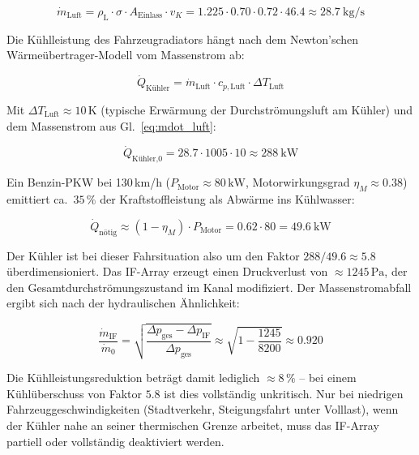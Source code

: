 ﻿\documentclass[12pt, a4paper]{report}
\theoremstyle{definition}
\theoremstyle{remark}
\newcommand{\rhoL}{\rho_{\text{L}}}
\newcommand{\Aeinlass}{A_{\text{Einlass}}}
\begin{document}
\begin{equation}
  \dot{m}_{\text{Luft}} = \rhoL \cdot \sigma \cdot \Aeinlass \cdot v_K
  = 1.225 \cdot 0.70 \cdot 0.72 \cdot 46.4 \approx \SI{28.7}{\kilo\gram\per\second}
  \label{eq:mdot_luft}
\end{equation}

Die Kühlleistung des Fahrzeugradiators hängt nach dem Newton'schen
Wärmeübertrager-Modell vom Massenstrom ab:

\begin{equation}
  \dot{Q}_{\text{Kühler}} = \dot{m}_{\text{Luft}} \cdot c_{p,\text{Luft}} \cdot \Delta T_{\text{Luft}}
  \label{eq:q_kuehler}
\end{equation}

Mit $\Delta T_{\text{Luft}} \approx 10\,\text{K}$ (typische Erwärmung der
Durchströmungsluft am Kühler) und dem Massenstrom aus Gl.~\eqref{eq:mdot_luft}:

\begin{equation}
  \dot{Q}_{\text{Kühler,0}} = 28.7 \cdot 1005 \cdot 10 \approx \SI{288}{\kilo\watt}
  \label{eq:q_kuehler_0}
\end{equation}

Ein Benzin-PKW bei 130\,km/h ($P_{\text{Motor}} \approx 80\,\text{kW}$,
Motorwirkungsgrad $\eta_M \approx 0.38$) emittiert ca.\ $35\,\%$ der
Kraftstoffleistung als Abwärme ins Kühlwasser:

\begin{equation}
  \dot{Q}_{\text{nötig}} \approx (1 - \eta_M) \cdot P_{\text{Motor}}
  = 0.62 \cdot 80 = \SI{49.6}{\kilo\watt}
  \label{eq:q_noetig}
\end{equation}

Der Kühler ist bei dieser Fahrsituation also um den Faktor $288/49.6 \approx 5.8$
überdimensioniert. Das IF-Array erzeugt einen Druckverlust von $\approx 1245\,\text{Pa}$,
der den Gesamtdurchströmungszustand im Kanal modifiziert. Der Massenstromabfall
ergibt sich nach der hydraulischen Ähnlichkeit:

\begin{equation}
  \frac{\dot{m}_{\text{IF}}}{\dot{m}_0}
  = \sqrt{\frac{\Delta p_{\text{ges}} - \Delta p_{\text{IF}}}{\Delta p_{\text{ges}}}}
  \approx \sqrt{1 - \frac{1245}{8200}} \approx 0.920
  \label{eq:massenstrom_ratio}
\end{equation}

Die Kühlleistungsreduktion beträgt damit lediglich $\approx 8\,\%$ --
bei einem Kühlüberschuss von Faktor $5.8$ ist dies vollständig unkritisch.
Nur bei niedrigen Fahrzeuggeschwindigkeiten (Stadtverkehr, Steigungsfahrt
unter Volllast), wenn der Kühler nahe an seiner thermischen Grenze arbeitet,
muss das IF-Array partiell oder vollständig deaktiviert werden.
\end{document}
